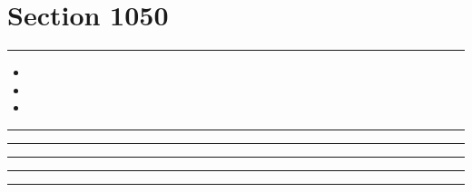 \documentclass[11pt,a4paper]{article}
\begin{document}
\section{Section 1050}
\begin{swarmwrap}%
  \begin{minipage}[t]{4cm}
    \centering
    \textcolor{green!30}{\rule{\linewidth}{8cm}}
  \end{minipage}%
\end{swarmwrap}%
\swarmwrapnext
\begin{itemize}
  \item \lipsum[1][1-3]
  \item \lipsum[2][1-3]
  \item \lipsum[3][1-3]
\end{itemize}
\begin{swarmwrap}%
  \begin{minipage}[t]{5cm}
    \centering
    \textcolor{red!20}{\rule{\linewidth}{9cm}}
  \end{minipage}%
\end{swarmwrap}%
\swarmwrapnext\lipsum[1]\lipsum[2]
\begin{swarmwrap}%
  \begin{minipage}[t]{2cm}
    \centering
    \textcolor{red!20}{\rule{\linewidth}{10cm}}
  \end{minipage}%
\end{swarmwrap}%
\swarmwrapnext\lipsum[1]\lipsum[2]\lipsum[3]
\begin{swarmwrap}%
  \begin{minipage}[t]{3cm}
    \centering
    \textcolor{red!20}{\rule{\linewidth}{2cm}}
  \end{minipage}%
\end{swarmwrap}%
\swarmwrapnext\lipsum[1]\lipsum[2]\lipsum[3]\lipsum[4]
\begin{swarmwrap}%
  \begin{minipage}[t]{4cm}
    \centering
    \textcolor{red!20}{\rule{\linewidth}{3cm}}
  \end{minipage}%
\end{swarmwrap}%
\swarmwrapnext\lipsum[1]\lipsum[2]\lipsum[3]\lipsum[4]\lipsum[5]
\begin{swarmwrap}%
  \begin{minipage}[t]{5cm}
    \centering
    \textcolor{red!20}{\rule{\linewidth}{4cm}}
  \end{minipage}%
\end{swarmwrap}%
\end{document}
